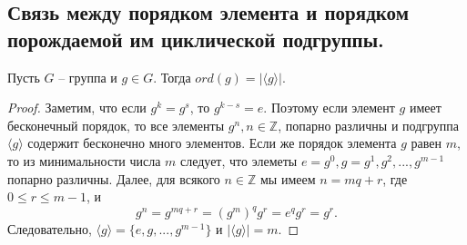\subsection{Связь между порядком элемента и порядком порождаемой им циклической подгруппы.}
\begin{statement}
    Пусть $G$ -- группа и $g \in G$. Тогда $ord(g) = |\langle g \rangle|$.
    \begin{proof}
        Заметим, что если $g^k = g^s$, то $g^{k-s} = e$. Поэтому если элемент $g$ имеет бесконечный порядок, то все элементы $g^n, n \in \mathbb{Z}$, попарно различны и подгруппа $\langle g \rangle$ содержит бесконечно много элементов. Если же порядок элемента $g$ равен $m$, то из минимальности числа $m$ следует, что элеметы $e = g^0, g = g^1, g^2,..., g^{m-1}$ попарно различны. Далее, для всякого $n \in \mathbb{Z}$ мы имеем $n = mq + r$, где $0 \leqslant r \leqslant m-1$, и
        \[
            g^n = g^{mq + r} = (g^m)^q g^r = e^q g^r = g^r.
        \]
        Следовательно, $\langle g \rangle = \{e, g, ..., g^{m-1}\}$ и $|\langle g \rangle | = m$.
    \end{proof}
\end{statement}
